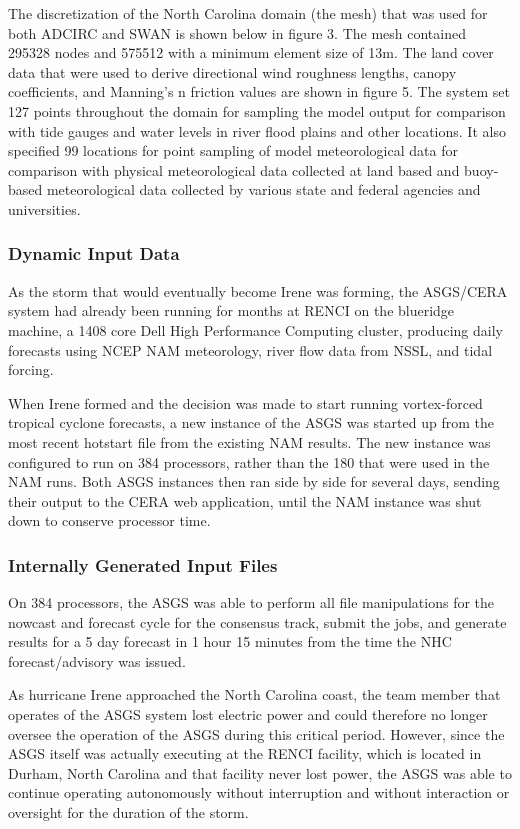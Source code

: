 \documentclass[12pt]{article}
\begin{document}
The discretization of the North Carolina domain (the mesh) that was 
used for both ADCIRC and SWAN is shown below in figure 3. The mesh 
contained 295328 nodes and 575512 with a minimum element size of 
13m. The land cover data that were used to derive directional wind 
roughness lengths, canopy coefficients, and Manning's n friction 
values are shown in figure 5. The system set 127 points throughout 
the domain for sampling the model output for comparison with tide 
gauges and water levels in river flood plains and other locations. 
It also specified 99 locations for point sampling of model 
meteorological data for comparison with physical meteorological data 
collected at land based and buoy-based meteorological data collected 
by various state and federal agencies and universities.

\subsubsection{Dynamic Input Data}

As the storm that would eventually become Irene was forming, the 
ASGS/CERA system had already been running for months at RENCI on the 
blueridge machine, a 1408 core Dell High Performance Computing 
cluster, producing daily forecasts using NCEP NAM meteorology, river 
flow data from NSSL, and tidal forcing. 

When Irene formed and the decision was made to start running 
vortex-forced tropical cyclone forecasts, a new instance of the ASGS 
was started up from the most recent hotstart file from the existing 
NAM results. The new instance was configured to run on 384 
processors, rather than the 180 that were used in the NAM runs. Both 
ASGS instances then ran side by side for several days, sending their 
output to the CERA web application, until the NAM instance was shut 
down to conserve processor time.

\subsubsection{Internally Generated Input Files}

On 384 processors, the ASGS was able to perform all file 
manipulations for the nowcast and forecast cycle for the consensus 
track, submit the jobs, and generate results for a 5 day forecast in 
1 hour 15 minutes from the time the NHC forecast/advisory was issued. 

As hurricane Irene approached the North Carolina coast, the team 
member that operates of the ASGS system lost electric power and 
could therefore no longer oversee the operation of the ASGS during 
this critical period. However, since the ASGS itself was actually 
executing at the RENCI facility, which is located in Durham, North 
Carolina and that facility never lost power, the ASGS was able to 
continue operating autonomously without interruption and without 
interaction or oversight for the duration of the storm.  
\end{document}
